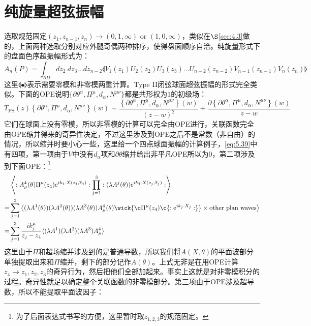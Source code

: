 \section{纯旋量超弦振幅}
\label{sec:5.4}
选取规范固定$(z_1,z_{n-1},z_n)\to(0,1,\infty)\text{ or }(1,0,\infty)$，类似在$\S$\ref{sec:4.3}做的，上面两种选取分别对应外腿奇偶两种排序，使得盘面顺序自洽。纯旋量形式下的盘面色序超振幅形式为：
\begin{equation}
	\label{eq:5.70}
	A_n(P)=\int_{\partial D}dz_2\mathrm{~}dz_3\ldots dz_{n-2}\llangle V_1(z_1)U_2(z_2)U_3(z_3)\ldots U_{n-2}(z_{n-2})V_{n-1}(z_{n-1})V_n(z_n)\rrangle
\end{equation}
这里$\llangle\bullet\rrangle$表示需要零模和非零模两重计算。Type II闭弦球面超弦振幅的形式完全类似。下面的OPE说明$\{ \partial\theta^\alpha, \Pi^\mu,d_\alpha, N^{\mu\nu} \}$都是共形权为$1$的初级场：
\begin{equation}
	T_{\mathrm{PS}}(z) \left\{ \partial\theta^{\alpha}, \Pi^{\mu}, d_{\alpha}, N^{\mu\nu} \right\}(w) \sim \frac{\left\{ \partial\theta^{\alpha}, \Pi^{\mu}, d_{\alpha}, N^{\mu\nu} \right\}(w)}{(z-w)^{2}} + \frac{\partial \left\{ \partial\theta^{\alpha}, \Pi^{\mu}, d_{\alpha}, N^{\mu\nu} \right\}(w)}{z-w}
\end{equation}
它们在球面上没有零模，所以非零模的计算可以完全由OPE进行，关联函数完全由OPE缩并得来的奇异性决定\cite{Berkovits:2004px}，不过这里涉及到OPE之后不是常数（非自由）的情况，所以缩并时要小心一些，这里给一个四点球面振幅的计算例子，\ref{eq:5.39}中有四项，第一项由于$V$中没有$d_\alpha$项和$\partial\theta$缩并给出非平凡OPE所以为$0$，第二项涉及到下面OPE：\footnote{为了后面表达式书写的方便，这里暂时取$z_{1,2,3}$的规范固定。}
\begin{equation}
	\begin{aligned}
		&\left\langle :A_\mu^4(\theta)\Pi^\mu(z_4)\mathrm{e}^{ik_4\cdot X(z_4,\overline{z}_4)}:\prod_{j=1}^3:(\lambda A^j(\theta))\mathrm{e}^{ik_4\cdot X(z_j,\overline{z}_j)}:\right\rangle\\
		=&\sum_{j=1}^3\left\langle(\lambda A^1(\theta))(\lambda A^2(\theta))(\lambda A^3(\theta))A_\mu^4(\theta)\wick{\c\Pi^\mu(z_4)\c{:\mathrm{e}^{ik_j\cdot X_j}:}}\times \text{other plan waves}\right\rangle\\
		=& \sum_{j=1}^3\frac{ik_j^\mu}{z_j-z_4}\langle(\lambda A^1)(\lambda A^2)(\lambda A^3)A_\mu^4\rangle
	\end{aligned}
\end{equation}
这里由于$\Pi$和超场缩并涉及到的是普通导数，所以我们将$A(X,\theta)$的平面波部分单独提取出来和$\Pi$缩并，剩下的部分记作$A(\theta)$。上式无非是在用OPE计算$z_4\to z_1,z_2,z_3$的奇异行为，然后把他们全部加起来。事实上这就是对非零模积分的过程。奇异性就足以确定整个关联函数的非零模部分。第三项由于OPE涉及超导数，所以不能提取平面波因子：
